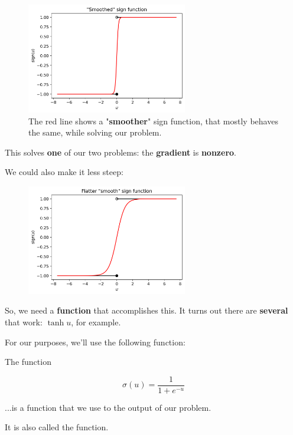         \begin{figure}[H]
            \centering
            
            \includegraphics[width=70mm,scale=0.5]{images/classification_images/smoothed_sign_function.png}
            \caption*{The red line shows a "\textbf{smoother}" sign function, that mostly behaves the same, while solving our problem.}
        \end{figure}
        
        This solves \textbf{one} of our two problems: the \textbf{gradient} is \textbf{nonzero}. 
        
        We could also make it less steep:
        
        \begin{figure}[H]
            \centering
            
            \includegraphics[width=70mm,scale=0.5]{images/classification_images/flatter_smooth_sign_function.png}
        \end{figure}
        
        So, we need a \textbf{function} that accomplishes this. It turns out there are \textbf{several} that work: $\tanh{u}$, for example.
        
        For our purposes, we'll use the following function:\\
        
        \begin{definition}
            The  function
            
            \begin{equation}
                \sigma(u) = \frac{1}{1+e^{-u}}
            \end{equation}
            
            ...is a  function that we use to  the output of our  problem.
            
            It is also called the  function.
        \end{definition}
        
